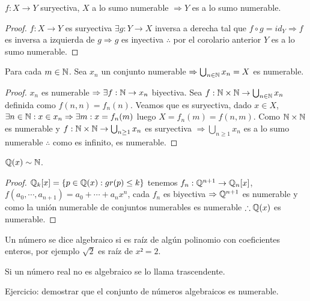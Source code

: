 \begin{theorem}
    \(f: X \to Y\) suryectiva, \(X\) a lo sumo numerable \(\Rightarrow Y\) es a lo sumo numerable.
    \begin{proof}
        \(f: X \to Y\) es suryectiva \(\exists g: Y \to X\) inversa a derecha tal que \(f \circ g = id_Y \Rightarrow f\) es inversa a izquierda de \(g \Rightarrow g\) es inyectiva \(\therefore\) por el corolario anterior \(Y\) es a lo sumo numerable.
    \end{proof}
\end{theorem}

\begin{theorem}
    Para cada \(m \in \mathbb{N}\). Sea \(x_n\) un conjunto numerable \(\Rightarrow \bigcup_{n \in \mathbb{N}}x_n = X\) es numerable.
    \begin{proof}
        \(x_n\) es numerable \(\Rightarrow \exists f:\mathbb{N} \to x_n\) biyectiva. Sea \(f:\mathbb{N} \times \mathbb{N} \to \bigcup_{n \in \mathbb{N}} x_n\) definida como \(f(n, n) = f_n(n)\). Veamos que es suryectiva, dado \(x \in X\), \(\exists n \in \mathbb{N}:x \in x_n \Rightarrow \exists m:x=f_n(m)\) luego \(X=f_n(m) = f(n, m)\). Como \(\mathbb{N} \times \mathbb{N}\) es numerable y \(f: \mathbb{N} \times \mathbb{N} \to \bigcup_{n \geq 1}{x_n}\) es suryectiva \(\Rightarrow \bigcup_{n \geq 1}x_n\) es a lo sumo numerable \(\therefore\) como es infinito, es numerable.
    \end{proof}
\end{theorem}

\begin{eg}
    \(\mathbb{Q}(x) \sim \mathbb{N}\).
    \begin{proof}
        \(\mathbb{Q}_k[x] = \{ p \in \mathbb{Q}(x) : gr(p) \leq k \}\) tenemos \(f_n : \mathbb{Q}^{n+1} \to \mathbb{Q}_n[x]\), \(f(a_0, \cdots, a_{n+1}) = a_0 + \cdots + a_nx^n\), cada \(f_n\) es biyectiva \(\Rightarrow \mathbb{Q}^{n+1}\) es numerable y como la unión numerable de conjuntos numerables es numerable \(\therefore \mathbb{Q}(x)\) es numerable.
    \end{proof}
\end{eg}

\begin{definition}
    Un número se dice algebraico si es raíz de algún polinomio con coeficientes enteros, por ejemplo \(\sqrt{2}\) es raíz de \(x² = 2\).
\end{definition}

\begin{definition}
    Si un número real no es algebraico se lo llama trascendente.
\end{definition}

Ejercicio: demostrar que el conjunto de números algebraicos es numerable.
